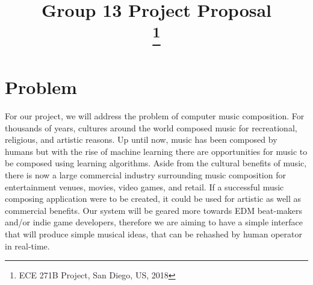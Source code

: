 \documentclass[conference]{IEEEtran}
\begin{document}
\title{Group 13 Project Proposal\\
\thanks{ECE 271B Project, San Diego, US, 2018}
}

\author{
\and
{}
\and
{}
\and
{}
\and
{}
}

\maketitle

\section{Problem}
For our project, we will address the problem of computer music composition. For thousands of years, cultures around the world composed music for recreational, religious, and artistic reasons. Up until now, music has been composed by humans but with the rise of machine learning there are opportunities for music to be composed using learning algorithms. Aside from the cultural benefits of music, there is now a large commercial industry surrounding music composition for entertainment venues, movies, video games, and retail. If a successful music composing application were to be created, it could be used for artistic as well as commercial benefits. Our system will be geared more towards EDM beat-makers and/or indie game developers, therefore we are aiming to have a simple interface that will produce simple musical ideas, that can be rehashed by human operator in real-time.
\end{document}
